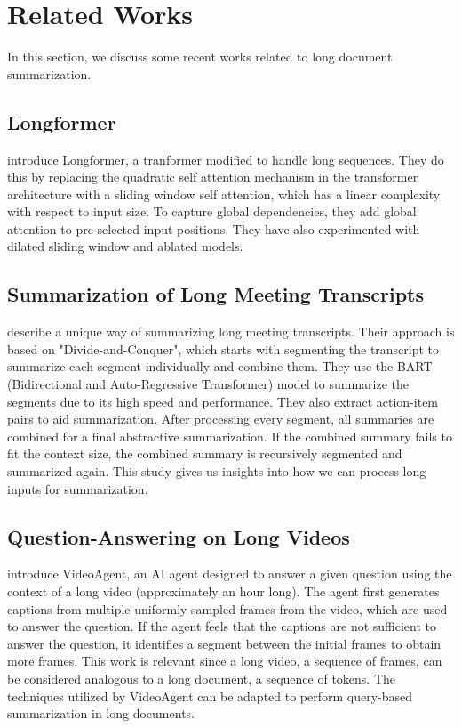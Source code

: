 \section{Related Works}

In this section, we discuss some recent works related to long document summarization.


\subsection*{Longformer}

\citet{beltagy2020longformer} introduce Longformer, a tranformer modified to handle
long sequences.
They do this by replacing the quadratic self attention mechanism in the transformer
architecture with a sliding window self attention, which has a linear complexity
with respect to input size.
To capture global dependencies, they add global attention to pre-selected input
positions.
They have also experimented with dilated sliding window and ablated models.


\subsection*{Summarization of Long Meeting Transcripts}

\citet{10.1145/3639233.3639253} describe a unique way of summarizing long meeting
transcripts.
Their approach is based on "Divide-and-Conquer", which starts with
segmenting the transcript to summarize each segment individually and combine them.
They use the BART (Bidirectional and Auto-Regressive Transformer) model to summarize
the segments due to its high speed and performance.
They also extract action-item pairs to aid summarization.
After processing every segment, all summaries are combined for a final abstractive
summarization.
If the combined summary fails to fit the context size, the combined summary is
recursively segmented and summarized again.
This study gives us insights into how we can process long inputs for summarization.


\subsection*{Question-Answering on Long Videos}

\citet{wang2024videoagent} introduce VideoAgent, an AI agent designed to answer a
given question using the context of a long video (approximately an hour long).
The agent first generates captions from multiple uniformly sampled frames from the
video, which are used to answer the question.
If the agent feels that the captions are not sufficient to answer the question, it
identifies a segment between the initial frames to obtain more frames.
This work is relevant since a long video, a sequence of frames, can be considered
analogous to a long document, a sequence of tokens. The techniques utilized by
VideoAgent can be adapted to perform query-based summarization in long documents.


